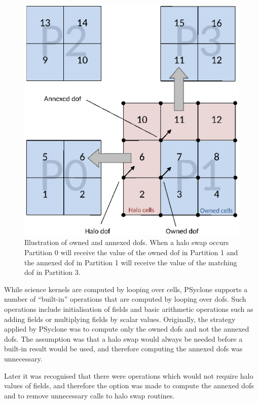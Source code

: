 \begin{figure}[ht!]
\begin{center}
\includegraphics[scale=0.6]{figs/DofOwnership.eps}
\caption{Illustration of owned and annexed dofs. When a halo swap
  occurs Partition 0 will receive the value of the owned dof in
  Partition 1 and the annexed dof in Partition 1 will receive the
  value of the matching dof in Partition 3.}
\label{fig:dofownership}
\end{center}
\end{figure}

While science kernels are computed by looping over cells, PSyclone
supports a number of ``built-in'' operations that are computed by
looping over dofs. Such operations include initialisation of fields
and basic arithmetic operations such as adding fields or multiplying
fields by scalar values. Originally, the strategy applied by PSyclone
was to compute only the owned dofs and not the annexed dofs. The
assumption was that a halo swap would always be needed before a
built-in result would be used, and therefore computing the annexed
dofs was unnecessary.

Later it was recognised that there were operations which would not
require halo values of fields, and therefore the option was made to
compute the annexed dofs and to remove unnecessary calls to halo swap
routines.

